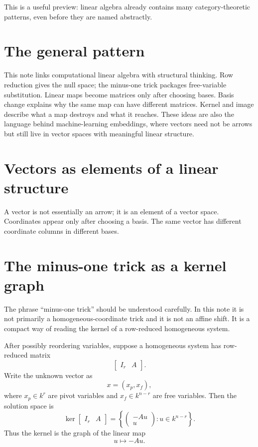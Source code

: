 This is a useful preview: linear algebra already contains many category-theoretic patterns, even before they are named abstractly.

\section{The general pattern}

This note links computational linear algebra with structural thinking.  Row reduction gives the null space; the minus-one trick packages free-variable substitution.  Linear maps become matrices only after choosing bases.  Basis change explains why the same map can have different matrices.  Kernel and image describe what a map destroys and what it reaches.  These ideas are also the language behind machine-learning embeddings, where vectors need not be arrows but still live in vector spaces with meaningful linear structure.

\section{Vectors as elements of a linear structure}
A vector is not essentially an arrow; it is an element of a vector space.  Coordinates appear only after choosing a basis.  The same vector has different coordinate columns in different bases.
\section{The minus-one trick as a kernel graph}

The phrase ``minus-one trick'' should be understood carefully.  In this note it is not primarily a homogeneous-coordinate trick and it is not an affine shift.  It is a compact way of reading the kernel of a row-reduced homogeneous system.

\begin{proposition}
After possibly reordering variables, suppose a homogeneous system has row-reduced matrix
\[
  \begin{bmatrix} I_r&A\end{bmatrix}.
\]
Write the unknown vector as
\[
  x=(x_p,x_f),
\]
where \(x_p\in k^r\) are pivot variables and \(x_f\in k^{n-r}\) are free variables.  Then the solution space is
\[
  \ker\begin{bmatrix} I_r&A\end{bmatrix}
  =
  \left\{
  \begin{pmatrix}-Au\\ u\end{pmatrix}
  :u\in k^{n-r}
  \right\}.
\]
Thus the kernel is the graph of the linear map
\[
  u\longmapsto -Au.
\]
\end{proposition}

